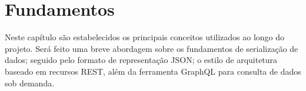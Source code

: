 \chapter{Fundamentos}

Neste capítulo são estabelecidos os principais conceitos utilizados ao longo do projeto. Será feito uma breve abordagem sobre os fundamentos de serialização de dados; seguido pelo formato de representação JSON; o estilo de arquitetura baseado em recursos REST, além da ferramenta GraphQL para consulta de dados sob demanda.






